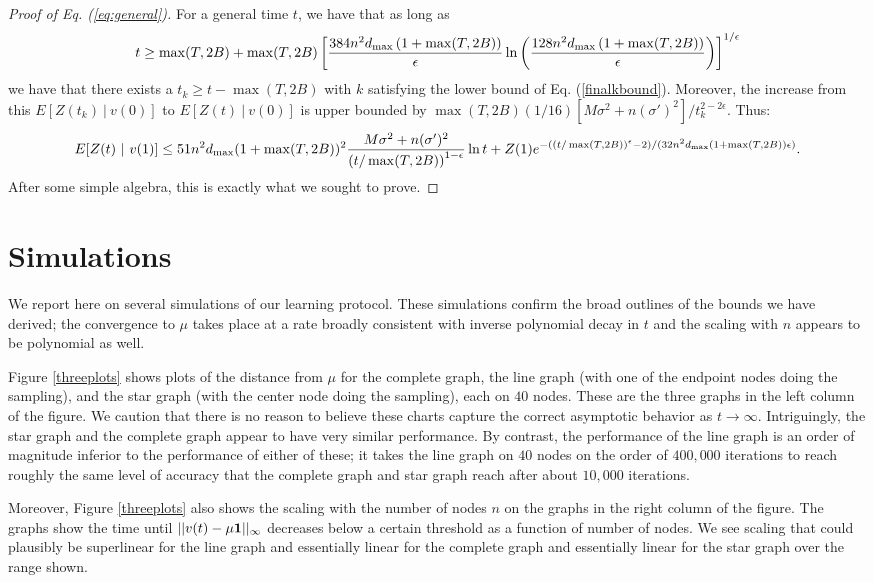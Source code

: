 \documentclass[final]{siamltex}
\begin{document}
\begin{proof}[Proof of Eq. (\ref{eq:general})]
For a general time $t$, we have that as long as 
\[ t \geq \max(T,2B) +  \max(T,2B) \left[ \frac{384 n^2 d_{\rm max} \left( 1 + \max(T,2B) \right) }{\epsilon} \ln \left( \frac{128 n^2 d_{\rm max} \left( 1 + \max(T,2B) \right) }{\epsilon} \right) \right]^{1/\epsilon} \] we have that there exists a $t_k \geq t - \max(T,2B)$ with $k$ satisfying the lower bound of Eq. (\ref{finalkbound}). Moreover, the increase from this $E[Z(t_k) ~|~ v(0)]$ to $E[Z(t) ~|~ v(0)]$ is upper bounded by $\max(T,2B) (1/16) \left[  M \sigma^2 + n  (\sigma')^2\right]/t_k^{2 - 2 \epsilon}$. Thus:
\[ E[ Z(t) ~|~ v(1) ] \leq 51 n^2 d_{\rm max} (1+\max(T,2B))^2  \frac{ M \sigma^2 + n  (\sigma')^2}{\left( t/\max(T,2B)  \right)^{1 - \epsilon}} \ln t + Z(1) e^{-( \left(t/\max(T,2B)\right)^\epsilon - 2)/(32n^2 d_{\rm max}  \left( 1 + \max(T,2B) \right) \epsilon)}. \] After some simple algebra, this is exactly what we sought to prove. 

 \end{proof}

\section{Simulations\label{sec:simul}} We report here on several simulations of our learning protocol. These simulations confirm the broad outlines of the bounds we have derived; the convergence to $\mu$ takes place at a rate broadly consistent with inverse polynomial decay in $t$ and the scaling with $n$ appears to be polynomial as well. 

Figure \ref{threeplots} shows  plots of the distance from $\mu$  for the complete graph, the line graph {{{(with one of the endpoint nodes doing the sampling)}}}, and the star graph {{{(with the center node doing the sampling)}}}, each on $40$ nodes. These are the three graphs in the left column of the figure. We caution that there is no reason to believe these charts capture the correct asymptotic behavior as $t \rightarrow \infty$. Intriguingly, the star graph and the complete graph appear to have very similar performance. By contrast, the performance of the line graph  is an order of magnitude inferior to the performance of either of these; it takes the line graph on $40$ nodes on the order of $400,000$ iterations to reach roughly the same level of accuracy that the complete graph and star graph reach after about $10,000$ iterations. 

Moreover, Figure \ref{threeplots} also shows the scaling with the number of nodes $n$ on the graphs in the right column of the figure. The graphs show the time until $||v(t) - \mu {{\bf 1}}||_{\infty}$ decreases below a certain threshold as a function of number of nodes. We see scaling that could plausibly be superlinear for the line graph and essentially linear for the complete graph and essentially linear for the star graph over the range shown.
\end{document}
